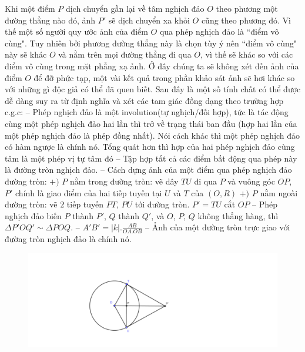 \begin{multicols}{2}
	\vskip 0.1cm
	Khi một điểm $P$ dịch chuyển gần lại về tâm nghịch đảo $O$ theo phương một đường thẳng nào đó, ảnh $P'$ sẽ dịch chuyển xa khỏi $O$ cũng theo phương đó. Vì thế một số người quy ước ảnh của điểm $O$ qua phép nghịch đảo là ``điểm vô cùng". Tuy nhiên bởi phương đường thẳng này là chọn tùy ý nên ``điểm vô cùng" này sẽ khác $O$ và nằm trên mọi đường thẳng đi qua $O$, vì thế sẽ khác so với các điểm vô cùng trong mặt phẳng xạ ảnh. Ở đây chúng ta sẽ không xét đến ảnh của điểm $O$ để đỡ phức tạp, một vài kết quả trong phần khảo sát ảnh sẽ hơi khác so với những gì độc giả có thể đã quen biết.
	\vskip 0.1cm
	Sau đây là một số tính chất có thể được dễ dàng suy ra từ định nghĩa và xét các tam giác đồng dạng theo trường hợp c.g.c:
	\vskip 0.1cm
	-- Phép nghịch đảo là một involution(tự nghịch/đối hợp), tức là tác động cùng một phép nghịch đảo hai lần thì trở về trạng thái ban đầu (hợp hai lần của một phép nghịch đảo là phép đồng nhất). Nói cách khác thì một phép nghịch đảo có hàm ngược là chính nó.
	Tổng quát hơn thì hợp của hai phép nghịch đảo cùng tâm là một phép vị tự tâm đó 
	\vskip 0.1cm
	-- Tập hợp tất cả các điểm bất động qua phép này là đường tròn nghịch đảo.
	\vskip 0.1cm
	-- Cách dựng ảnh của một điểm qua phép nghịch đảo đường tròn:
	\vskip 0.1cm
	$+)$ $P$ nằm trong đường tròn: vẽ dây $TU$ đi qua $P$ và vuông góc $OP$, $P'$ chính là giao điểm của hai tiếp tuyến tại $U$ và $T$ của $(O, R)$
	\vskip 0.1cm
	$+)$ $P$ nằm ngoài đường tròn: vẽ $2$ tiếp tuyến $PT$, $PU$ tới đường tròn. $P' = TU$ cắt $OP$
	\vskip 0.1cm
	-- Phép nghịch đảo biến $P$ thành $P'$, $Q$ thành $Q'$, và $O$, $P$, $Q$ không thẳng hàng, thì $\Delta  P'OQ' \sim  \Delta POQ$.
	\vskip 0.1cm
	-- $A'B' = |k|. \frac{AB}{OA.OB}$
	\vskip 0.1cm
	-- Ảnh của một đường tròn trực giao với đường tròn nghịch đảo là chính nó.
	\begin{figure}[H]
		\vspace*{-5pt}
		\centering
		\captionsetup{labelformat= empty, justification=centering}
		\includegraphics[width= 1\linewidth]{Dựng ảnh phép nghịch đảo.pdf}

\end{figure}
\end{multicols}
